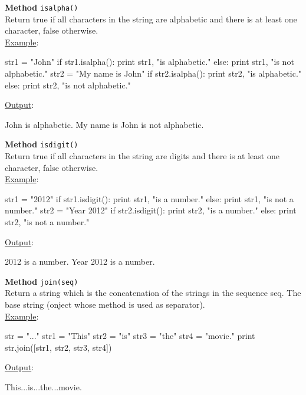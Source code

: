\noindent
{\bf Method} {\tt isalpha()}\\

\noindent
Return true if all characters in the string are alphabetic and 
there is at least one character, false otherwise.\\

\noindent
\underline{Example}:
\begin{bluecode}
str1 = "John"
if str1.isalpha():
    print str1, "is alphabetic."
else: 
    print str1, "is not alphabetic."
str2 = "My name is John"
if str2.isalpha():
    print str2, "is alphabetic."
else: 
    print str2, "is not alphabetic."
\end{bluecode}
\underline{Output}:
\begin{bluecode}
John is alphabetic.
My name is John is not alphabetic.
\end{bluecode}
\vspace{4mm}

\noindent
{\bf Method} {\tt isdigit()}\\

\noindent
Return true if all characters in the string are digits and there is at least one character, false otherwise.\\

\noindent
\underline{Example}:
\begin{bluecode}
str1 = "2012"
if str1.isdigit():
    print str1, "is a number."
else: 
    print str1, "is not a number."
str2 = "Year 2012"
if str2.isdigit():
    print str2, "is a number."
else: 
    print str2, "is not a number."
\end{bluecode}
\underline{Output}:
\begin{bluecode}
2012 is a number.
Year 2012 is a number.
\end{bluecode}
\vspace{4mm}

\noindent
{\bf Method} {\tt join(seq)}\\

\noindent
Return a string which is the concatenation of the strings in the sequence seq. The 
base string (onject whose method is used as separator).\\

\noindent
\underline{Example}:
\begin{bluecode}
str = "..."
str1 = "This"
str2 = "is"
str3 = "the"
str4 = "movie."
print str.join([str1, str2, str3, str4])
\end{bluecode}
\underline{Output}:
\begin{bluecode}
This...is...the...movie.
\end{bluecode}
\vspace{4mm}

